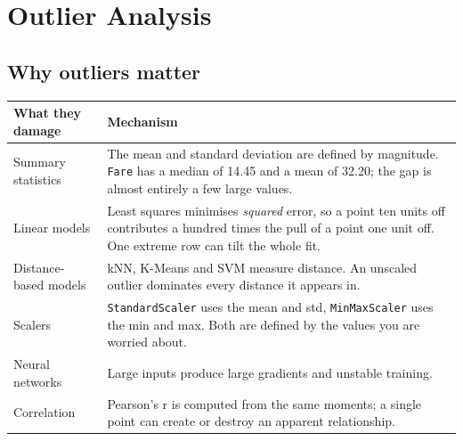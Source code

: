 \documentclass[11pt,a4paper]{article}
\begin{document}
\newpage
\section{Outlier Analysis}


\subsection{Why outliers matter}

\begin{tabularx}{\textwidth}{@{}l X@{}}
\toprule
\rowcolor{tablehead} \textbf{What they damage} & \textbf{Mechanism} \\
\midrule
Summary statistics & The mean and standard deviation are defined by magnitude. \texttt{Fare} has a median of 14.45 and a mean of 32.20; the gap is almost entirely a few large values. \\
Linear models & Least squares minimises \emph{squared} error, so a point ten units off contributes a hundred times the pull of a point one unit off. One extreme row can tilt the whole fit. \\
Distance-based models & kNN, K-Means and SVM measure distance. An unscaled outlier dominates every distance it appears in. \\
Scalers & \lstinline|StandardScaler| uses the mean and std, \lstinline|MinMaxScaler| uses the min and max. Both are defined by the values you are worried about. \\
Neural networks & Large inputs produce large gradients and unstable training. \\
Correlation & Pearson's r is computed from the same moments; a single point can create or destroy an apparent relationship. \\
\bottomrule
\end{tabularx}

\end{document}
